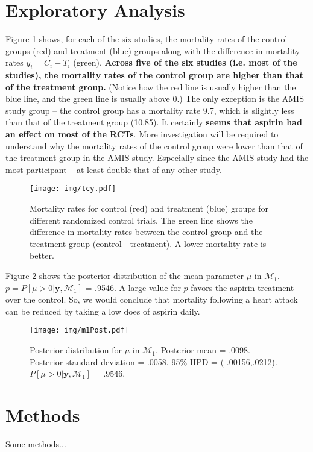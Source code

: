 \documentclass{../../tex_template/asaproc}
\newcommand{\bk}[1]{\left[#1\right]}
\newcommand{\M}{\mathcal{M}}
\begin{document}
\section{Exploratory Analysis}
Figure \ref{fig:tcy} shows, for each of the six studies, the mortality rates of
the control groups (red) and treatment (blue) groups along with the difference
in mortality rates $y_i = C_i-T_i$ (green). \textbf{Across five of the six studies
(i.e. most of the studies), the mortality rates of the control group are higher
than that of the treatment group.} (Notice how the red line is usually higher
than the blue line, and the green line is usually above 0.) The only exception
is the AMIS study group -- the control group has a mortality rate 9.7, which is
slightly less than that of the treatment group (10.85). It certainly \textbf{seems
that aspirin had an effect on most of the RCTs}. More investigation will be
required to understand why the mortality rates of the control group were lower
than that of the treatment group in the AMIS study. Especially since the AMIS
study had the most participant -- at least double that of any other study.

\begin{figure}[H]
  \texttt{[image: img/tcy.pdf]}
  \caption{\small Mortality rates for control (red) and treatment (blue) groups
  for different randomized control trials. The green line shows the difference
  in mortality rates between the control group and the treatment group (control -
  treatment). A lower mortality rate is better.}
  \label{fig:tcy}
\end{figure}

Figure \ref{fig:m1Post} shows the posterior distribution of the mean parameter
$\mu$ in $\M_1$. $p=P\bk{\mu>0|\bm{y},\M_1}$ = .9546. A large
value for $p$ favors the aspirin treatment over the control. So, we would
conclude that mortality following a heart attack can be reduced by taking a low
does of aspirin daily.

\begin{figure}[H]
  \texttt{[image: img/m1Post.pdf]}
  \caption{\small Posterior distribution for $\mu$ in $\M_1$.
  Posterior mean = .0098. Posterior standard deviation = .0058.
  95\% HPD = (-.00156,.0212). $P\bk{\mu>0|\bm{y},\M_1}$ = .9546.}
  \label{fig:m1Post}
\end{figure}



\section{Methods}
Some methods...
\end{document}
